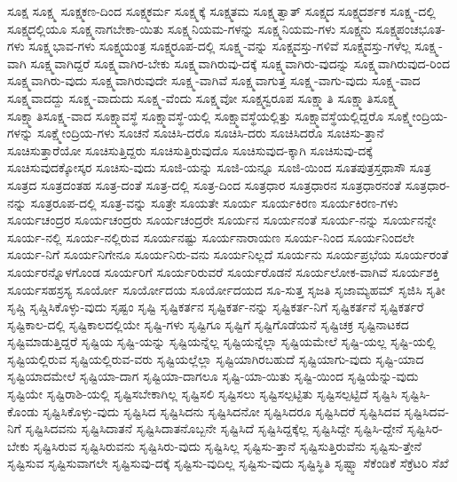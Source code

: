 {ಸೂಕ್ಷ
ಸೂಕ್ಷ್ಮ
ಸೂಕ್ಷ್ಮಕಣ-ದಿಂದ
ಸೂಕ್ಷ್ಮಕರ್ಮ
ಸೂಕ್ಷ್ಮಕ್ಕೆ
ಸೂಕ್ಷ್ಮತಮ
ಸೂಕ್ಷ್ಮತ್ವಾತ್
ಸೂಕ್ಷ್ಮದ
ಸೂಕ್ಷ್ಮದರ್ಶಕ
ಸೂಕ್ಷ್ಮ-ದಲ್ಲಿ
ಸೂಕ್ಷ್ಮದಲ್ಲಿಯೂ
ಸೂಕ್ಷ್ಮನಾಗಬೇಕಾ-ಯಿತು
ಸೂಕ್ಷ್ಮನಿಯಮ-ಗಳನ್ನು
ಸೂಕ್ಷ್ಮನಿಯಮ-ಗಳು
ಸೂಕ್ಷ್ಮನು
ಸೂಕ್ಷ್ಮಪಂಚಭೂತ-ಗಳು
ಸೂಕ್ಷ್ಮಭಾವ-ಗಳು
ಸೂಕ್ಷ್ಮಯಂತ್ರ
ಸೂಕ್ಷ್ಮರೂಪ-ದಲ್ಲಿ
ಸೂಕ್ಷ್ಮ-ವನ್ನು
ಸೂಕ್ಷ್ಮವಸ್ತು-ಗಳಿವೆ
ಸೂಕ್ಷ್ಮವಸ್ತು-ಗಳೆಲ್ಲ
ಸೂಕ್ಷ್ಮ-ವಾಗಿ
ಸೂಕ್ಷ್ಮವಾಗಿದ್ದರೆ
ಸೂಕ್ಷ್ಮವಾಗಿರ-ಬೇಕು
ಸೂಕ್ಷ್ಮವಾಗಿರುವು-ದಕ್ಕೆ
ಸೂಕ್ಷ್ಮವಾಗಿರು-ವುದನ್ನು
ಸೂಕ್ಷ್ಮವಾಗಿರುವುದ-ರಿಂದ
ಸೂಕ್ಷ್ಮವಾಗಿರು-ವುದು
ಸೂಕ್ಷ್ಮವಾಗಿರುವುದೇ
ಸೂಕ್ಷ್ಮ-ವಾಗಿವೆ
ಸೂಕ್ಷ್ಮವಾಗುತ್ತ
ಸೂಕ್ಷ್ಮ-ವಾಗು-ವುದು
ಸೂಕ್ಷ್ಮ-ವಾದ
ಸೂಕ್ಷ್ಮವಾದದ್ದು
ಸೂಕ್ಷ್ಮ-ವಾದುದು
ಸೂಕ್ಷ್ಮ-ವೆಂದು
ಸೂಕ್ಷ್ಮವೋ
ಸೂಕ್ಷ್ಮಸ್ವರೂಪ
ಸೂಕ್ಷ್ಮಾತಿ
ಸೂಕ್ಷ್ಮಾತಿಸೂಕ್ಷ್ಮ
ಸೂಕ್ಷ್ಮಾತಿಸೂಕ್ಷ್ಮ-ವಾದ
ಸೂಕ್ಷ್ಮಾವಸ್ಥೆ
ಸೂಕ್ಷ್ಮಾವಸ್ಥೆ-ಯಲ್ಲಿ
ಸೂಕ್ಷ್ಮಾವಸ್ಥೆಯಲ್ಲಿತ್ತು
ಸೂಕ್ಷ್ಮಾವಸ್ಥೆಯಲ್ಲಿದ್ದರೊ
ಸೂಕ್ಷ್ಮೇಂದ್ರಿಯ-ಗಳನ್ನು
ಸೂಕ್ಷ್ಮೇಂದ್ರಿಯ-ಗಳು
ಸೂಚನೆ
ಸೂಚಿಸಿ-ದರೊ
ಸೂಚಿಸಿ-ದರು
ಸೂಚಿಸಿದರೊ
ಸೂಚಿಸು-ತ್ತಾನೆ
ಸೂಚಿಸುತ್ತಾರೆಯೋ
ಸೂಚಿಸುತ್ತಿದ್ದರು
ಸೂಚಿಸುತ್ತಿರುವುದೊ
ಸೂಚಿಸುವುದ-ಕ್ಕಾಗಿ
ಸೂಚಿಸುವು-ದಕ್ಕೆ
ಸೂಚಿಸುವುದಕ್ಕೋಸ್ಕರ
ಸೂಚಿಸು-ವುದು
ಸೂಜಿ-ಯನ್ನು
ಸೂಜಿ-ಯನ್ನೂ
ಸೂಜಿ-ಯಿಂದ
ಸೂತಪುತ್ರಸ್ತಥಾಸೌ
ಸೂತ್ರ
ಸೂತ್ರದ
ಸೂತ್ರದಂತಹ
ಸೂತ್ರ-ದಂತೆ
ಸೂತ್ರ-ದಲ್ಲಿ
ಸೂತ್ರ-ದಿಂದ
ಸೂತ್ರಧಾರ
ಸೂತ್ರಧಾರನ
ಸೂತ್ರಧಾರನಂತೆ
ಸೂತ್ರಧಾರ-ನನ್ನು
ಸೂತ್ರರೂಪ-ದಲ್ಲಿ
ಸೂತ್ರ-ವನ್ನು
ಸೂತ್ರೇ
ಸೂಯತೇ
ಸೂರ್ಯ
ಸೂರ್ಯಕಿರಣ
ಸೂರ್ಯಕಿರಣ-ಗಳು
ಸೂರ್ಯಚಂದ್ರರ
ಸೂರ್ಯಚಂದ್ರರು
ಸೂರ್ಯಚಂದ್ರರೇ
ಸೂರ್ಯನ
ಸೂರ್ಯನಂತೆ
ಸೂರ್ಯ-ನನ್ನು
ಸೂರ್ಯನನ್ನೇ
ಸೂರ್ಯ-ನಲ್ಲಿ
ಸೂರ್ಯ-ನಲ್ಲಿರುವ
ಸೂರ್ಯನಷ್ಟು
ಸೂರ್ಯನಾರಾಯಣ
ಸೂರ್ಯ-ನಿಂದ
ಸೂರ್ಯನಿಂದಲೇ
ಸೂರ್ಯ-ನಿಗೆ
ಸೂರ್ಯನಿಗೇನೂ
ಸೂರ್ಯನಿರು-ವನು
ಸೂರ್ಯನಿಲ್ಲದೆ
ಸೂರ್ಯನು
ಸೂರ್ಯಪ್ರಭೆಯ
ಸೂರ್ಯರಂತೆ
ಸೂರ್ಯರನ್ನೊಳಗೊಂಡ
ಸೂರ್ಯರಿಗೆ
ಸೂರ್ಯರಿರುವರೆ
ಸೂರ್ಯರೊಡನೆ
ಸೂರ್ಯಲೋಕ-ವಾಗಿವೆ
ಸೂರ್ಯಶಕ್ತಿ
ಸೂರ್ಯಸಹಸ್ರಸ್ಯ
ಸೂರ್ಯೋ
ಸೂರ್ಯೋದಯ
ಸೂರ್ಯೋದಯದ
ಸೂ-ಸುತ್ತ
ಸೃಜತಿ
ಸೃಜಾಮ್ಯಹಮ್
ಸೃಜಿಸಿ
ಸೃತೀ
ಸೃಷ್ಚಿ
ಸೃಷ್ಚಿಸಿಕೊಳ್ಳು-ವುದು
ಸೃಷ್ಟಂ
ಸೃಷ್ಟಿ
ಸೃಷ್ಟಿಕರ್ತನ
ಸೃಷ್ಟಿಕರ್ತ-ನನ್ನು
ಸೃಷ್ಟಿಕರ್ತ-ನಿಗೆ
ಸೃಷ್ಟಿಕರ್ತನೆ
ಸೃಷ್ಟಿಕರ್ತರೆ
ಸೃಷ್ಟಿಕಾಲ-ದಲ್ಲಿ
ಸೃಷ್ಟಿಕಾಲದಲ್ಲಿಯೇ
ಸೃಷ್ಟಿ-ಗಳು
ಸೃಷ್ಟಿಗೂ
ಸೃಷ್ಟಿಗೆ
ಸೃಷ್ಟಿಗೊಡೆಯನೆ
ಸೃಷ್ಟಿಚಕ್ರ
ಸೃಷ್ಟಿನಾಟಕದ
ಸೃಷ್ಟಿಮಾಡುತ್ತಿದ್ದರೆ
ಸೃಷ್ಟಿಯ
ಸೃಷ್ಟಿ-ಯನ್ನು
ಸೃಷ್ಟಿಯನ್ನೆಲ್ಲ
ಸೃಷ್ಟಿಯನ್ನೆಲ್ಲಾ
ಸೃಷ್ಟಿಯಮೇಲೆ
ಸೃಷ್ಟಿ-ಯಲ್ಲ
ಸೃಷ್ಟಿ-ಯಲ್ಲಿ
ಸೃಷ್ಟಿಯಲ್ಲಿರುವ
ಸೃಷ್ಟಿಯಲ್ಲಿರುವ-ವರು
ಸೃಷ್ಟಿಯಲ್ಲೆಲ್ಲಾ
ಸೃಷ್ಟಿಯಾಗಿರಬಹುದೆ
ಸೃಷ್ಟಿಯಾಗು-ವುದು
ಸೃಷ್ಟಿ-ಯಾದ
ಸೃಷ್ಟಿಯಾದಮೇಲೆ
ಸೃಷ್ಟಿಯಾ-ದಾಗ
ಸೃಷ್ಟಿಯಾ-ದಾಗಲೂ
ಸೃಷ್ಟಿ-ಯಾ-ಯಿತು
ಸೃಷ್ಟಿ-ಯಿಂದ
ಸೃಷ್ಟಿಯೆನ್ನು-ವುದು
ಸೃಷ್ಟಿಯೇ
ಸೃಷ್ಟಿರಾಶಿ-ಯಲ್ಲಿ
ಸೃಷ್ಟಿಸಬೇಕಾಗಿಲ್ಲ
ಸೃಷ್ಟಿಸಲಿ
ಸೃಷ್ಟಿಸಲು
ಸೃಷ್ಟಿಸಲ್ಪಟ್ಟಿತು
ಸೃಷ್ಟಿಸಲ್ಪಟ್ಟಿದೆ
ಸೃಷ್ಟಿಸಿ
ಸೃಷ್ಟಿಸಿ-ಕೊಂಡು
ಸೃಷ್ಟಿಸಿಕೊಳ್ಳು-ವುದು
ಸೃಷ್ಟಿಸಿದ
ಸೃಷ್ಟಿಸಿದನು
ಸೃಷ್ಟಿಸಿದನೋ
ಸೃಷ್ಟಿಸಿದರೂ
ಸೃಷ್ಟಿಸಿದರೆ
ಸೃಷ್ಟಿಸಿದವ
ಸೃಷ್ಟಿಸಿದವ-ನಿಗೆ
ಸೃಷ್ಟಿಸಿದವನು
ಸೃಷ್ಟಿಸಿದಾತನೆ
ಸೃಷ್ಟಿಸಿದಾತನೊಬ್ಬನೇ
ಸೃಷ್ಟಿಸಿದೆ
ಸೃಷ್ಟಿಸಿದ್ದಕ್ಕೆಲ್ಲ
ಸೃಷ್ಟಿಸಿದ್ದೇ
ಸೃಷ್ಟಿಸಿ-ದ್ದೇನೆ
ಸೃಷ್ಟಿಸಿರ-ಬೇಕು
ಸೃಷ್ಟಿಸಿರುವ
ಸೃಷ್ಟಿಸಿರುವನು
ಸೃಷ್ಟಿಸಿರು-ವುದು
ಸೃಷ್ಟಿಸಿಲ್ಲ
ಸೃಷ್ಟಿಸು-ತ್ತಾನೆ
ಸೃಷ್ಟಿಸುತ್ತಿರುವೆನು
ಸೃಷ್ಟಿಸು-ತ್ತೇನೆ
ಸೃಷ್ಟಿಸುವ
ಸೃಷ್ಟಿಸುವಾಗಲೇ
ಸೃಷ್ಟಿಸುವು-ದಕ್ಕೆ
ಸೃಷ್ಟಿಸು-ವುದಿಲ್ಲ
ಸೃಷ್ಟಿಸು-ವುದು
ಸೃಷ್ಟಿಸ್ಥಿತಿ
ಸೃಷ್ಟ್ವಾ
ಸೆಕೆಂಡಿಕೆ
ಸೆಕ್ರೆಟರಿ
ಸೆಖೆ
}
